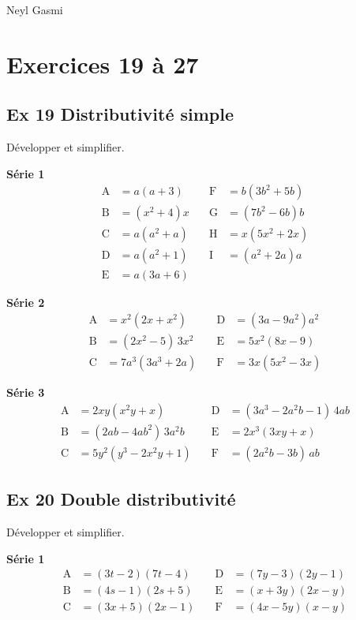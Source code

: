 \documentclass[a4paper,11pt]{article}
\begin{document}
Neyl Gasmi

\section*{Exercices 19 à 27}

\subsection*{Ex 19 \; Distributivité simple}
Développer et simplifier.

\textbf{Série 1}
\[
\begin{aligned}
\mathrm{A}&=a(a+3) &\quad \mathrm{F}&=b(3b^{2}+5b)\\
\mathrm{B}&=(x^{2}+4)x &\quad \mathrm{G}&=(7b^{2}-6b)b\\
\mathrm{C}&=a(a^{2}+a) &\quad \mathrm{H}&=x(5x^{2}+2x)\\
\mathrm{D}&=a(a^{2}+1) &\quad \mathrm{I}&=(a^{2}+2a)a\\
\mathrm{E}&=a(3a+6)
\end{aligned}
\]

\textbf{Série 2}
\[
\begin{aligned}
\mathrm{A}&=x^{2}(2x+x^{2}) &\quad \mathrm{D}&=(3a-9a^{2})a^{2}\\
\mathrm{B}&=(2x^{2}-5)\,3x^{2} &\quad \mathrm{E}&=5x^{2}(8x-9)\\
\mathrm{C}&=7a^{3}(3a^{3}+2a) &\quad \mathrm{F}&=3x(5x^{2}-3x)
\end{aligned}
\]

\textbf{Série 3}
\[
\begin{aligned}
\mathrm{A}&=2xy(x^{2}y+x) &\quad \mathrm{D}&=(3a^{3}-2a^{2}b-1)\,4ab\\
\mathrm{B}&=(2ab-4ab^{2})\,3a^{2}b &\quad \mathrm{E}&=2x^{3}(3xy+x)\\
\mathrm{C}&=5y^{2}(y^{3}-2x^{2}y+1) &\quad \mathrm{F}&=(2a^{2}b-3b)\,ab
\end{aligned}
\]

\subsection*{Ex 20 \; Double distributivité}
Développer et simplifier.

\textbf{Série 1}
\[
\begin{aligned}
\mathrm{A}&=(3t-2)(7t-4) &\quad \mathrm{D}&=(7y-3)(2y-1)\\
\mathrm{B}&=(4s-1)(2s+5) &\quad \mathrm{E}&=(x+3y)(2x-y)\\
\mathrm{C}&=(3x+5)(2x-1) &\quad \mathrm{F}&=(4x-5y)(x-y)
\end{aligned}
\]
\end{document}
